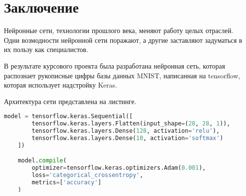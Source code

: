 \section{Заключение}

Нейронные сети, технологии прошлого века, меняют работу целых отраслей. Одни возмодности нейронной сети поражают, а другие заставляют задуматься в их пользу как специалистов.

В результате курсового проекта была разработана нейронная сеть,
которая распознает рукописные цифры базы данных MNIST,
написанная на tensorflow,
которая использует надстройку Keras.

Архитектура сети представлена на листинге.

\begin{lstlisting}[language=Python]
    model = tensorflow.keras.Sequential([
        tensorflow.keras.layers.Flatten(input_shape=(28, 28, 1)),
        tensorflow.keras.layers.Dense(128, activation='relu'),
        tensorflow.keras.layers.Dense(10, activation='softmax')
    ])

    model.compile(
        optimizer=tensorflow.keras.optimizers.Adam(0.001),
        loss='categorical_crossentropy',
        metrics=['accuracy']
    )
\end{lstlisting}